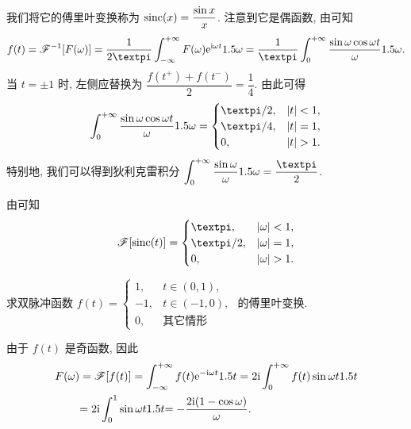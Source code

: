 我们将它的傅里叶变换称为  $\operatorname{sinc}(x)=\dfrac{\sin x}x$.
注意到它是偶函数, 由\thmFI 可知
\[
  f(t)=\msf^{-1}[F(\omega)]=\frac1{2\cpi}\intff F(\omega)\ee^{\ii \omega t}\d\omega
  =\frac1\cpi\intf\frac{\sin\omega\cos\omega t}{\omega}\d \omega.
\]
当 $t=\pm1$ 时, 左侧应替换为 $\dfrac{f(t^+)+f(t^-)}2=\dfrac14$.
由此可得
\[
  \intf\frac{\sin \omega\cos\omega t}\omega\d\omega=\begin{cases}
    \cpi/2,&\abs{t}<1,\\
    \cpi/4,&\abs{t}=1,\\
    0,&\abs{t}>1.
  \end{cases}
\]
特别地, 我们可以得到狄利克雷积分 $\intf\frac{\sin\omega}\omega\d\omega=\frac\cpi2$.

由\thmFSym 可知
\[
  \msf[\sinc(t)]=\begin{cases}
    \cpi,&\abs{\omega}<1,\\
    \cpi/2,&\abs{\omega}=1,\\
    0,&\abs{\omega}>1.
  \end{cases}
\]

\begin{example}\label{exam:double-pulse}
  求双脉冲函数 $f(t)=
    \begin{cases}
      1,&t\in(0,1),\\
      -1,&t\in(-1,0),\\
      0,&\text{其它情形}
    \end{cases}$
  的傅里叶变换.
\end{example}

\begin{solution}
  由于 $f(t)$ 是奇函数, 因此
  \begin{align*}
    F(\omega)&=\mathscr{F}[f(t)]
    =\displaystyle\int_{-\infty}^{+\infty} f(t)\mathrm{e}^{-\mathrm{i} \omega t}1.5 t
    =2\mathrm{i} \displaystyle\int_0^{+\infty} f(t)\sin{\omega t}1.5 t\\
    &{=2\mathrm{i} \int_0^1\sin{\omega t}1.5 t}
    {=-\frac{2\mathrm{i} (1-\cos\omega)}\omega.}
  \end{align*}
\end{solution}

